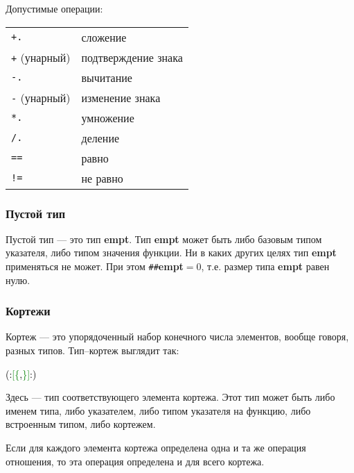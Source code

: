 \documentclass[10pt]{report}
\begin{document}
Допустимые операции:
\begin{longtable}{ll}
\texttt{+.}             & сложение                                          \\
\texttt{+} (унарный)    & подтверждение знака                               \\
\texttt{-.}             & вычитание                                         \\
\texttt{-} (унарный)    & изменение знака                                   \\
\texttt{*.}             & умножение                                         \\
\texttt{/.}             & деление                                           \\
\texttt{==}             & равно                                             \\
\texttt{!=}             & не равно                                          \\
\end{longtable}
        

        \subsubsection{Пустой тип}
Пустой тип --- это тип \textbf{empt}. Тип \textbf{empt} может быть либо базовым типом указателя, либо типом значения функции. Ни в каких других целях тип \textbf{empt} применяться не может. При этом \texttt{\#\#}\textbf{empt}$=0$, т.е. размер типа \textbf{empt} равен нулю.

        \subsubsection{Кортежи}
Кортеж --- это упорядоченный набор конечного числа элементов, вообще говоря, разных типов. Тип--кортеж выглядит так:
\begin{center}
\noindent\textcolor{Green}{\textcolor{Black}{(:}[\{\textcolor{Black}{,}\}]\textcolor{Black}{:)}}
\end{center}        
   
Здесь \textcolor{Green}{}  --- тип соответствующего элемента кортежа. Этот тип может быть либо именем типа, либо указателем, либо типом указателя на функцию, либо встроенным типом, либо кортежем.

Если для каждого элемента кортежа определена одна и та же операция отношения, то эта операция определена и для всего кортежа.
\end{document}
